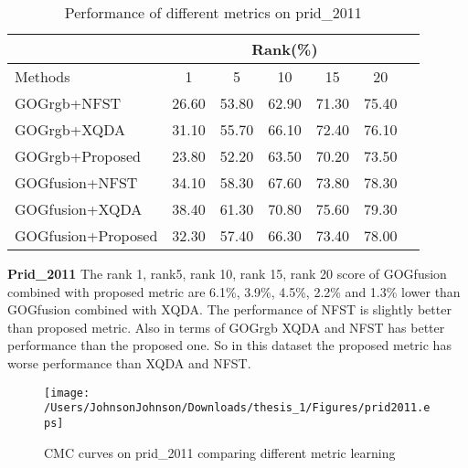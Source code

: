 

\begin{table}[H]
\centering
\caption{Performance of different metrics on prid\_2011}
\begin{tabular}{|l|c|c|c|c|c|c|}
\hline
& \multicolumn{5}{|c|}{Rank(\%)} \\
\hline
Methods& 1 & 5 &10& 15&20\\
\hline
GOGrgb+NFST&26.60 &53.80& 62.90&71.30&75.40 \\ 
\hline
GOGrgb+XQDA&31.10 & 55.70& 66.10 & 72.40&76.10\\  
\hline
GOGrgb+Proposed&23.80&52.20&63.50&70.20&73.50\\  %
\hline
GOGfusion+NFST&34.10 &58.30& 67.60&73.80&78.30 \\  
\hline
GOGfusion+XQDA&38.40& 61.30&70.80&75.60&79.30\\
\hline
GOGfusion+Proposed&32.30&57.40&66.30&73.40&78.00\\ %

\hline

\end{tabular}\newline
\end{table}

\textbf{Prid\_2011}  The  rank 1, rank5, rank 10, rank 15, rank 20 score of GOGfusion  combined with proposed metric are 6.1\%, 3.9\%, 4.5\%, 2.2\% and 1.3\% lower than GOGfusion combined with XQDA. The performance of NFST is slightly better than proposed metric. Also in terms of GOGrgb XQDA and NFST has better performance than the proposed one. So in this dataset the proposed metric has worse performance than XQDA and NFST.

\begin{figure}[H]
\begin{raggedleft}
\texttt{[image: /Users/JohnsonJohnson/Downloads/thesis\_1/Figures/prid2011.eps]}
\vspace{-3em}
\caption{CMC curves on prid\_2011 comparing different metric learning}
\end{raggedleft}
\end{figure}

